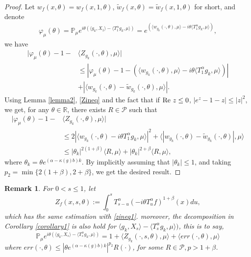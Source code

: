 \documentclass{article}
\newtheorem{remark}{Remark}[section]
\begin{document}
\begin{proof}
    Let $ w_f(x,\theta)=w_f(x,1,\theta)$, $\tilde{w}_f(x,\theta)=\tilde{w}_f(x,1,\theta)$ for short, and denote
\begin{align}\label{charfirst}
    \varphi_{\mu}(\theta)=\mathbb{P}_{\mu}e^{i\theta(\langle g_k, X_1\rangle-\langle T_1^{\alpha}g_k,\mu \rangle)}=e^{(\langle w_{g_k}(\cdot,\theta),\mu \rangle-i\theta \langle T_1^{\alpha} g_k, \mu \rangle)},
\end{align}
 we have
\begin{align*}
    |\varphi_{\mu}(\theta)-1-& \langle Z_{g_k}(\cdot, \theta),\mu\rangle|\\
    &\leq|\varphi_{\mu}(\theta)-1-\left( \langle w_{g_k}(\cdot,\theta), \mu \rangle-i\theta \langle T_1^{\alpha}g_k,\mu\rangle\right)|\\
    &+|\langle w_{g_k}(\cdot,\theta)-\tilde{w}_{g_k}(\cdot,\theta),\mu \rangle|.
\end{align*}
Using Lemma \ref{lemma2}, \eqref{Zineq} and the fact that if $ {\rm Re~} z\leq 0$, $|e^z-1-z|\leq|z|^2$,   we get, for any $\theta \in \mathbb{R}$, there exists $R\in \mathcal{P}$ such that 
\begin{align*}
    |\varphi_{\mu}(\theta)-1-& \langle Z_{g_k}(\cdot, \theta),\mu\rangle|\\
    &\leq 2|\langle w_{g_k}(\cdot,\theta)-i\theta T_1^{\alpha}g_k, \mu \rangle|^2 + \langle |w_{g_k}(\cdot,\theta)-\tilde{w}_{g_k}(\cdot,\theta)|, \mu \rangle\\
    &\leq |\theta_{k}|^{2(1+\beta)}\langle R,\mu\rangle + |\theta_{k}|^{2+\beta}\langle R,\mu\rangle,
\end{align*}
where $\theta_k=\theta e^{(\alpha-\kappa(g)b)k}$. By implicitly assuming that $|\theta_k|\leq 1$, and taking $p_2=\min \{2(1+\beta), 2+\beta\}$, we get the desired result.
\end{proof}  
\begin{remark}\label{remark1}
   For $0<s\leq 1$, let 
   $$Z_f(x,s,\theta):=\int_0^s T^{\alpha}_{s-u}(-i\theta T_u^{\alpha}f)^{1+\beta}(x)du ,$$
   which has the same estimation with \eqref{zineq1}. moreover, the decomposition in Corollary \ref{corollary1} is also hold for $\langle g_k, X_s\rangle-\langle T_s^{\alpha}g_k,\mu \rangle)$, this is to say,
   $$\mathbb{P}_{\mu}e^{i\theta(\langle g_k, X_s\rangle-\langle T_s^{\alpha}g_k,\mu \rangle)}=1+\langle Z_{g_k}(\cdot,s,\theta),\mu\rangle+\langle err(\cdot,\theta),\mu\rangle$$
   where $err(\cdot,\theta)\leq |\theta e^{(\alpha-\kappa(g)b)k}|^{p_2}R(\cdot)$, for some $R\in \mathcal{P}, p>1+\beta$.
\end{remark}
\end{document}
